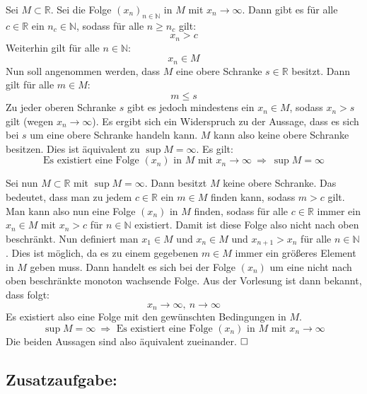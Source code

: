 \documentclass[10pt, a4paper]{article}
\begin{document}
		Sei $M \subset \mathbb{R}$. Sei die Folge $(x_n)_{n \in \mathbb{N}}$ in $M$ mit $x_n \longrightarrow \infty$. Dann gibt es für alle $c \in \mathbb{R}$ ein $n_c \in \mathbb{N}$, sodass für alle $n \geq n_c$ gilt:
		\[
			x_n > c
		\]
		Weiterhin gilt für alle $n \in \mathbb{N}$:
		\[
			x_n \in M
		\]
		Nun soll angenommen werden, dass $M$ eine obere Schranke $s \in \mathbb{R}$ besitzt. Dann gilt für alle $m \in M$:
		\[
			m \leq s
		\]
		Zu jeder oberen Schranke $s$ gibt es jedoch mindestens ein $x_n \in M$, sodass $x_n > s$ gilt (wegen $x_n \longrightarrow \infty$). Es ergibt sich ein Widerspruch zu der Aussage, dass es sich bei $s$ um eine obere Schranke handeln kann. $M$ kann also keine obere Schranke besitzen. Dies ist äquivalent zu $\sup M = \infty$. Es gilt:
		\[
			\text{Es existiert eine Folge $(x_n)$ in $M$ mit } x_n \longrightarrow \infty  \ \Rightarrow \  \sup M = \infty
		\]

		Sei nun $M \subset \mathbb{R}$ mit $\sup M = \infty$. Dann besitzt $M$ keine obere Schranke. Das bedeutet, dass man zu jedem $c \in \mathbb{R}$ ein $m \in M$ finden kann, sodass $m > c$ gilt. Man kann also nun eine Folge $(x_n)$ in $M$ finden, sodass für alle $c \in \mathbb{R}$ immer ein $x_n \in M$ mit $x_n > c$ für $n \in \mathbb{N}$ existiert. Damit ist diese Folge also nicht nach oben beschränkt. Nun definiert man $x_1 \in M$ und $x_{n} \in M$ und $x_{n+1} > x_{n}$ für alle $n \in \mathbb{N}$. Dies ist möglich, da es zu einem gegebenen $m \in M$ immer ein größeres Element in $M$ geben muss. Dann handelt es sich bei der Folge $(x_n)$ um eine nicht nach oben beschränkte monoton wachsende Folge. Aus der Vorlesung ist dann bekannt, dass folgt:
		\[
			x_n \longrightarrow \infty, \ n \longrightarrow \infty
		\]
		Es existiert also eine Folge mit den gewünschten Bedingungen in $M$.
		\[
			\sup M = \infty \ \Rightarrow \text{ Es existiert eine Folge $(x_n)$ in $M$ mit } x_n \longrightarrow \infty
		\]
		Die beiden Aussagen sind also äquivalent zueinander. $\hfill\Box$
		
		


	\newpage

	\subsection*{Zusatzaufgabe:} %
	\label{sub:zusatzaufgabe_}
	
\end{document}
